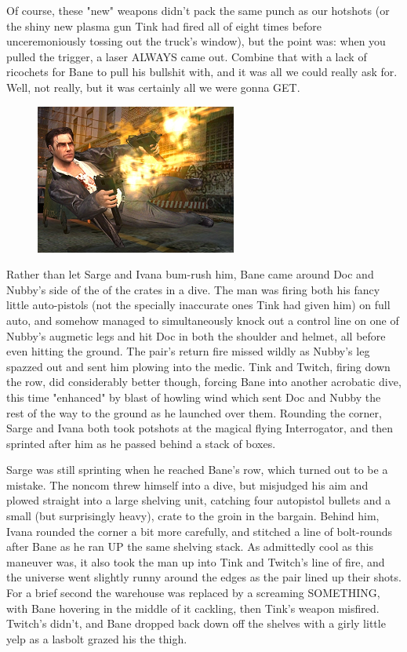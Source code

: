 Of course, these "new" weapons didn't pack the same punch as our hotshots (or the shiny new plasma gun Tink had fired all of eight times before unceremoniously tossing out the truck's window), but the point was: 
when you pulled the trigger, a laser ALWAYS came out. 
Combine that with a lack of ricochets for Bane to pull his bullshit with, and it was all we could really ask for. 
Well, not really, but it was certainly all we were gonna GET.

\begin{figure}
	\begin{center}
		\includegraphics[width=\figwidth]{pics/19/52.png}
	\end{center}
\end{figure}
Rather than let Sarge and Ivana bum-rush him, Bane came around Doc and Nubby's side of the of the crates in a dive. 
The man was firing both his fancy little auto-pistols (not the specially inaccurate ones Tink had given him) on full auto, and somehow managed to simultaneously knock out a control line on one of Nubby's augmetic legs and hit Doc in both the shoulder and helmet, all before even hitting the ground. 
The pair's return fire missed wildly as Nubby's leg spazzed out and sent him plowing into the medic. 
Tink and Twitch, firing down the row, did considerably better though, forcing Bane into another acrobatic dive, this time "enhanced" by blast of howling wind which sent Doc and Nubby the rest of the way to the ground as he launched over them. 
Rounding the corner, Sarge and Ivana both took potshots at the magical flying Interrogator, and then sprinted after him as he passed behind a stack of boxes.

Sarge was still sprinting when he reached Bane's row, which turned out to be a mistake. 
The noncom threw himself into a dive, but misjudged his aim and plowed straight into a large shelving unit, catching four autopistol bullets and a small (but surprisingly heavy), crate to the groin in the bargain. 
Behind him, Ivana rounded the corner a bit more carefully, and stitched a line of bolt-rounds after Bane as he ran UP the same shelving stack. 
As admittedly cool as this maneuver was, it also took the man up into Tink and Twitch's line of fire, and the universe went slightly runny around the edges as the pair lined up their shots. 
For a brief second the warehouse was replaced by a screaming SOMETHING, with Bane hovering in the middle of it cackling, then Tink's weapon misfired. 
Twitch's didn't, and Bane dropped back down off the shelves with a girly little yelp as a lasbolt grazed his the thigh.

